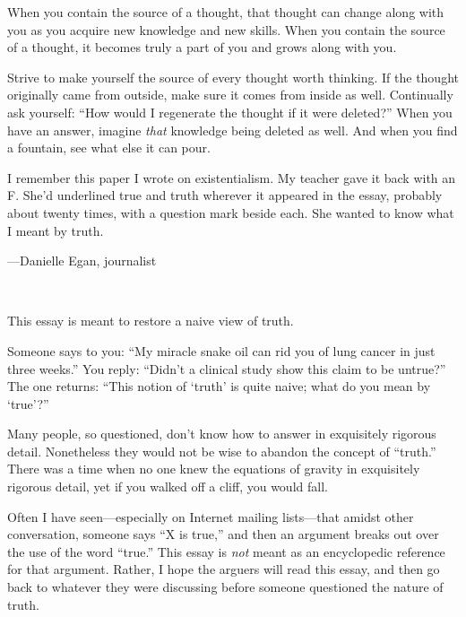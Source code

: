 {
 When you contain the source of a thought, that thought can change
along with you as you acquire new knowledge and new skills. When you
contain the source of a thought, it becomes truly a part of you and
grows along with you.}

{
 Strive to make yourself the source of every thought worth
thinking. If the thought originally came from outside, make sure it
comes from inside as well. Continually ask yourself:
``How would I regenerate the thought if it were
deleted?'' When you have an answer, imagine
\textit{that} knowledge being deleted as well. And when you find a
fountain, see what else it can pour.}

\myendsectiontext


\bigskip


{
 I remember this paper I wrote on existentialism. My teacher gave
it back with an F. She'd underlined true and truth
wherever it appeared in the essay, probably about twenty times, with a
question mark beside each. She wanted to know what I meant by truth.}

{\raggedleft
 {}---Danielle Egan, journalist
\par}


\bigskip

{
 ~}

{
 This essay is meant to restore a naive view of truth.}

{
 Someone says to you: ``My miracle snake oil can
rid you of lung cancer in just three weeks.'' You
reply: ``Didn't a clinical study show
this claim to be untrue?'' The one returns:
``This notion of
`truth' is quite naive; what do you mean
by `true'?''}

{
 Many people, so questioned, don't know how to
answer in exquisitely rigorous detail. Nonetheless they would not be
wise to abandon the concept of
``truth.'' There was a time when no
one knew the equations of gravity in exquisitely rigorous detail, yet
if you walked off a cliff, you would fall.}

{
 Often I have seen---especially on Internet mailing lists---that
amidst other conversation, someone says ``X is
true,'' and then an argument breaks out over the use
of the word ``true.'' This essay is
\textit{not} meant as an encyclopedic reference for that argument.
Rather, I hope the arguers will read this essay, and then go back to
whatever they were discussing before someone questioned the nature of
truth.}

